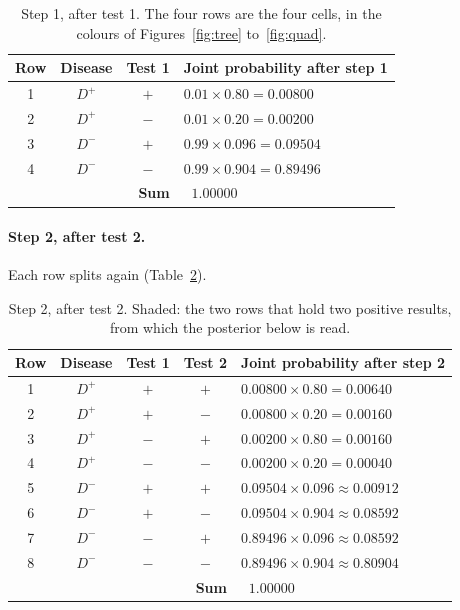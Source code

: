 \documentclass[11pt]{article}
\begin{document}
\begin{table}[H]
\centering
\renewcommand{\arraystretch}{1.15}
\begin{tabular}{c|c|c|l}
\toprule
\textbf{Row} & \textbf{Disease} & \textbf{Test 1} & \textbf{Joint probability after step 1} \\
\midrule
\rowcolor{tpcol} 1 & $D^+$ & $+$ & $0.01 \times 0.80 = 0.00800$ \\
\rowcolor{fncol} 2 & $D^+$ & $-$ & $0.01 \times 0.20 = 0.00200$ \\
\rowcolor{fpcol} 3 & $D^-$ & $+$ & $0.99 \times 0.096 = 0.09504$ \\
\rowcolor{tncol} 4 & $D^-$ & $-$ & $0.99 \times 0.904 = 0.89496$ \\
\midrule
  & \multicolumn{2}{r|}{\textbf{Sum}} & $\;\;\mathbf{1.00000}$ \\
\bottomrule
\end{tabular}
\caption{Step 1, after test 1. The four rows are the four cells, in the colours of Figures~\ref{fig:tree} to~\ref{fig:quad}.}
\label{tab:s1}
\end{table}

\paragraph{Step 2, after test 2.} Each row splits again (Table~\ref{tab:s2}).

\begin{table}[H]
\centering
\renewcommand{\arraystretch}{1.15}
\begin{tabular}{c|c|c|c|l}
\toprule
\textbf{Row} & \textbf{Disease} & \textbf{Test 1} & \textbf{Test 2} & \textbf{Joint probability after step 2} \\
\midrule
\rowcolor{rowsel} 1 & $D^+$ & $+$ & $+$ & $0.00800 \times 0.80 = 0.00640$ \\
2 & $D^+$      & $+$ & $-$ & $0.00800 \times 0.20   = 0.00160$ \\
3 & $D^+$      & $-$ & $+$ & $0.00200 \times 0.80   = 0.00160$ \\
4 & $D^+$      & $-$ & $-$ & $0.00200 \times 0.20   = 0.00040$ \\
\rowcolor{rowsel} 5 & $D^-$ & $+$ & $+$ & $0.09504 \times 0.096 \approx 0.00912$ \\
6 & $D^-$ & $+$ & $-$ & $0.09504 \times 0.904  \approx 0.08592$ \\
7 & $D^-$ & $-$ & $+$ & $0.89496 \times 0.096  \approx 0.08592$ \\
8 & $D^-$ & $-$ & $-$ & $0.89496 \times 0.904  \approx 0.80904$ \\
\midrule
  & \multicolumn{3}{r|}{\textbf{Sum}} & $\;\;\mathbf{1.00000}$ \\
\bottomrule
\end{tabular}
\caption{Step 2, after test 2. Shaded: the two rows that hold two positive results, from which the posterior below is read.}
\label{tab:s2}
\end{table}
\end{document}
